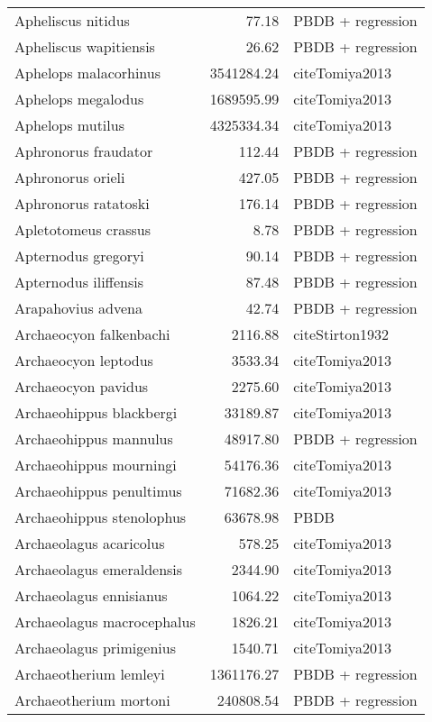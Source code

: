\begin{table}[ht]
\begin{tabular}{lrl}
  Apheliscus nitidus & 77.18 & PBDB + regression \\ 
  Apheliscus wapitiensis & 26.62 & PBDB + regression \\ 
  Aphelops malacorhinus & 3541284.24 & cite{Tomiya2013} \\ 
  Aphelops megalodus & 1689595.99 & cite{Tomiya2013} \\ 
  Aphelops mutilus & 4325334.34 & cite{Tomiya2013} \\ 
  Aphronorus fraudator & 112.44 & PBDB + regression \\ 
  Aphronorus orieli & 427.05 & PBDB + regression \\ 
  Aphronorus ratatoski & 176.14 & PBDB + regression \\ 
  Apletotomeus crassus & 8.78 & PBDB + regression \\ 
  Apternodus gregoryi & 90.14 & PBDB + regression \\ 
  Apternodus iliffensis & 87.48 & PBDB + regression \\ 
  Arapahovius advena & 42.74 & PBDB + regression \\ 
  Archaeocyon falkenbachi & 2116.88 & cite{Stirton1932} \\ 
  Archaeocyon leptodus & 3533.34 & cite{Tomiya2013} \\ 
  Archaeocyon pavidus & 2275.60 & cite{Tomiya2013} \\ 
  Archaeohippus blackbergi & 33189.87 & cite{Tomiya2013} \\ 
  Archaeohippus mannulus & 48917.80 & PBDB + regression \\ 
  Archaeohippus mourningi & 54176.36 & cite{Tomiya2013} \\ 
  Archaeohippus penultimus & 71682.36 & cite{Tomiya2013} \\ 
  Archaeohippus stenolophus & 63678.98 & PBDB \\ 
  Archaeolagus acaricolus & 578.25 & cite{Tomiya2013} \\ 
  Archaeolagus emeraldensis & 2344.90 & cite{Tomiya2013} \\ 
  Archaeolagus ennisianus & 1064.22 & cite{Tomiya2013} \\ 
  Archaeolagus macrocephalus & 1826.21 & cite{Tomiya2013} \\ 
  Archaeolagus primigenius & 1540.71 & cite{Tomiya2013} \\ 
  Archaeotherium lemleyi & 1361176.27 & PBDB + regression \\ 
  Archaeotherium mortoni & 240808.54 & PBDB + regression \\ 

\end{tabular}
\end{table}
